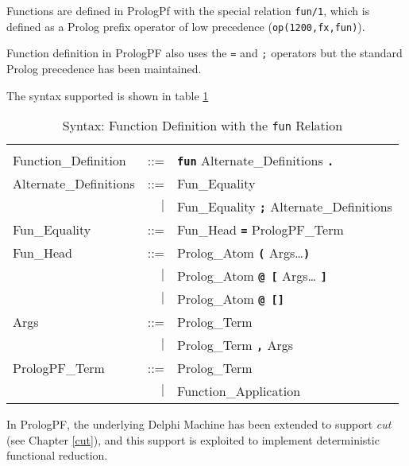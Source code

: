 Functions are defined in PrologPf with the special relation
\texttt{fun/1}, which is defined as a Prolog
prefix operator of low precedence (\texttt{op(1200,fx,fun)}).

Function definition in PrologPF also uses the \texttt{=} and \texttt{;}
operators but the standard Prolog precedence has been maintained.

The syntax supported is shown in table \ref{syntax:fun}

\begin{table}[htbp]
{\small
\begin{tabular}{|l r l|}
\hline
 & &\\[2mm]
Function\_{}Definition & ::= & \texttt{\textbf{fun}}
                               Alternate\_{}Definitions
                               \texttt{\textbf{.}}\\[4mm]

Alternate\_{}Definitions & ::= & Fun\_{}Equality\\
                      & $|$ & Fun\_{}Equality \texttt{\textbf{;}}
                              Alternate\_{}Definitions\\[4mm]

Fun\_{}Equality  & ::= & Fun\_{}Head \texttt{\textbf{=}} PrologPF\_{}Term\\[4mm]

Fun\_{}Head      & ::= & Prolog\_{}Atom \texttt{\textbf{(}} Args\ldots \texttt{\textbf{)}}\\
                 &  $|$  & Prolog\_{}Atom \texttt{\textbf{@ [}} Args\ldots
                            \texttt{\textbf{]}}\\
                 &  $|$  & Prolog\_{}Atom \texttt{\textbf{@ []}}\\[4mm]

Args             & ::= & Prolog\_{}Term\\
                 &   $|$ & Prolog\_{}Term \texttt{\textbf{,}} Args\\[4mm]

PrologPF\_{}Term & ::= & Prolog\_{}Term\\
                 & $|$ & Function\_{}Application\\[4mm]
 
\hline
\end{tabular}
}
\caption{Syntax: Function Definition with the \texttt{fun} Relation}
\label{syntax:fun}
\end{table}

In PrologPF, the underlying Delphi Machine has been extended to support \textit{cut}
(see Chapter \ref{cut}), and this support is exploited to implement deterministic 
functional reduction.

